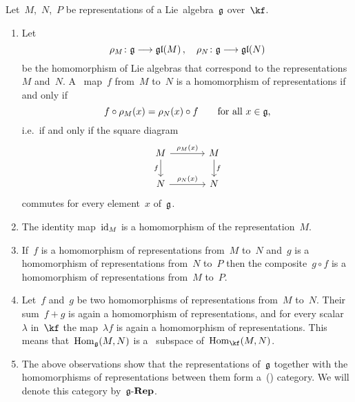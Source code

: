 \begin{remark}
  Let~$M$,~$N$,~$P$ be representations of a Lie~algebra~$\mathfrak{g}$ over~$\kf$.
  \begin{enumerate}
    \item
      Let
      \[
        \rho_M
        \colon
        \glie
        \to
        \gllie(M) \,,
        \quad
        \rho_N
        \colon
        \glie
        \to
        \gllie(N)
      \]
      be the homomorphism of Lie algebras that correspond to the representations~$M$ and~$N$.
      A~{\linear{$\kf$}} map~$f$ from~$M$ to~$N$ is a homomorphism of representations if and only if
      \[
        f \circ \rho_M(x)
        =
        \rho_N(x) \circ f
        \qquad
        \text{for all~$x \in \mathfrak{g}$,}
      \]
      i.e.\ if and only if the square diagram
      \[
        \begin{tikzcd}[column sep = large]
          M
          \arrow{r}[above]{\rho_M(x)}
          \arrow{d}[left]{f}
          &
          M
          \arrow{d}[right]{f}
          \\
          N
          \arrow{r}[above]{\rho_N(x)}
          &
          N
        \end{tikzcd}
      \]
      commutes for every element~$x$ of~$\mathfrak{g}$.
    \item
      The identity map~$\mathrm{id}_M$ is a homomorphism of the representation~$M$.
    \item
      If~$f$ is a homomorphism of representations from~$M$ to~$N$ and~$g$ is a homomorphism of representations from~$N$ to~$P$ then the composite~$g \circ f$ is a homomorphism of representations from~$M$ to~$P$.
    \item
      Let~$f$ and~$g$ be two homomorphisms of representations from~$M$ to~$N$.
      Their sum~$f + g$ is again a homomorphism of representations, and for every scalar~$\lambda$ in~$\kf$ the map~$\lambda f$ is again a homomorphism of representations.
      This means that~$\operatorname{Hom}_{\mathfrak{g}}(M,N)$ is a~{\linear{$\kf$}} subspace of~$\Hom_{\kf}(M,N)$.
    \item
      The above observations show that the representations of~$\mathfrak{g}$ together with the homomorphisms of representations between them form a~(\linear{$\kf$}) category.
      We will denote this category by~$\mathfrak{g}\text{-}\mathbf{Rep}$.


\end{enumerate}
\end{remark}
